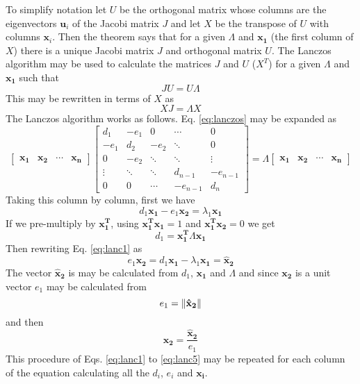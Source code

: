 \documentclass{mbd_fullpaper}
\begin{document}
To simplify notation let $U$ be the orthogonal matrix whose columns are the eigenvectors $\mathbf{u}_i$ of the Jacobi matrix $J$ and let $X$ be the transpose of $U$ with columns $\mathbf{x}_i$.
Then the theorem says that for a given $\Lambda$ and $\mathbf{x_1}$ (the first column of $X$) there is a unique Jacobi matrix $J$ and orthogonal matrix $U$.
The Lanczos algorithm may be used to calculate the matrices $J$ and $U$ ($X^T$) for a given $\Lambda$ and $\mathbf{x_1}$ such that 
\begin{equation}
J U = U \Lambda
\end{equation}
This may be rewritten in terms of $X$ as
\begin{equation}
X J = \Lambda X
\label{eq:lanczos}
\end{equation}
The Lanczos algorithm works as follows.
Eq. \ref{eq:lanczos} may be expanded as
\begin{equation}
\begin{bmatrix} \mathbf{x_1} &  \mathbf{x_2} & \cdots & \mathbf{x_n} \end{bmatrix}
\begin{bmatrix} d_1  &  -e_1 & 0 & \cdots & 0 \\
-e_1 & d_2  & -e_2 & \ddots & 0 \\
0 & -e_2 & \ddots & \ddots & \vdots \\
\vdots & \ddots & \ddots & d_{n-1} & -e_{n-1} \\
0 & 0 & \cdots & -e_{n-1} & d_n \end{bmatrix}
=
\Lambda
\begin{bmatrix} \mathbf{x_1} &  \mathbf{x_2} & \cdots & \mathbf{x_n} \end{bmatrix}
\end{equation}
Taking this column by column, first we have
\begin{equation}
d_1 \mathbf{x_1} - e_1 \mathbf{x_2} = \lambda_1 \mathbf{x_1}
\label{eq:lanc1}
\end{equation}
If we pre-multiply by $\mathbf{x_1^T}$, using $\mathbf{x_1^T} \mathbf{x_1}=1$ and $\mathbf{x_1^T} \mathbf{x_2}=0$ we get
\begin{equation}
d_1 = \mathbf{x_1^T} \Lambda \mathbf{x_1}
\label{eq:lanc2} 
\end{equation}
Then rewriting Eq. \ref{eq:lanc1} as
\begin{equation}
e_1 \mathbf{x_2} = d_1 \mathbf{x_1} - \lambda_1 \mathbf{x_1} = \mathbf{\hat{x}_2}
\label{eq:lanc3}
\end{equation}
The vector $\mathbf{\hat{x}_2}$ is may be calculated from $d_1$, $\mathbf{x_1}$ and $\Lambda$ and since $\mathbf{x_2}$ is a unit vector $e_1$ may be calculated from
\begin{equation}
e_1 = \left\lVert\mathbf{\hat{x}_2}\right\rVert
\label{eq:lanc4}
\end{equation}
and then
\begin{equation}
\mathbf{x_2} = \frac{\mathbf{\hat{x}_2}}{e_1}
\label{eq:lanc5}
\end{equation}
This procedure of Eqs. \ref{eq:lanc1} to \ref{eq:lanc5} may be repeated for each column of the equation calculating all the $d_i$, $e_i$ and $\mathbf{x_i}$.
\end{document}
